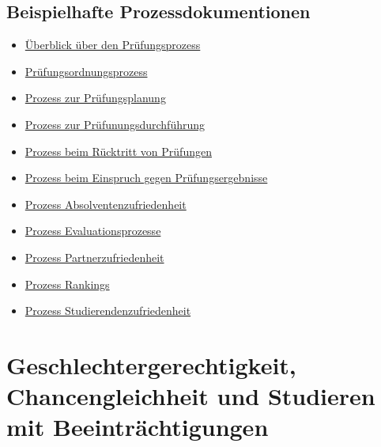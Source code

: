 \section{Beispielhafte
Prozessdokumentionen}\label{beispielhafte-prozessdokumentionen}

\begin{itemize}
\tightlist
\item
  \href{https://th-koeln.github.io/mi-2017/anhaenge/Prozessbeschreibung_PruefungsprozessUeberblick.pdf}{Überblick
  über den Prüfungsprozess}
\item
  \href{https://th-koeln.github.io/mi-2017/anhaenge/Prozessbeschreibung_Pruefungsordnungsprozess.pdf}{Prüfungsordnungsprozess}
\item
  \href{https://th-koeln.github.io/mi-2017/anhaenge/Prozessbeschreibung_Pruefungplanung.pdf}{Prozess zur
  Prüfungsplanung}
\item
  \href{https://th-koeln.github.io/mi-2017/anhaenge/Prozessbeschreibung_Pruefungdurchfuehren.pdf}{Prozess
  zur Prüfunungsdurchführung}
\item
  \href{https://th-koeln.github.io/mi-2017/anhaenge/Prozessbeschreibung_vonPruefungzuruecktreten.pdf}{Prozess
  beim Rücktritt von Prüfungen}
\item
  \href{https://th-koeln.github.io/mi-2017/anhaenge/Prozessbeschreibung_EinspruchPruefungsergebnisse.pdf}{Prozess
  beim Einspruch gegen Prüfungsergebnisse}
\item
  \href{https://th-koeln.github.io/mi-2017/anhaenge/Prozessbeschreibung-Absolventenzufriedenheit.pdf}{Prozess
  Absolventenzufriedenheit}
\item
  \href{https://th-koeln.github.io/mi-2017/anhaenge/Prozessbeschreibung-Evaluationsprozesse.pdf}{Prozess
  Evaluationsprozesse}
\item
  \href{https://th-koeln.github.io/mi-2017/anhaenge/Prozessbeschreibung-Partnerzufriedenheit.pdf}{Prozess
  Partnerzufriedenheit}
\item
  \href{https://th-koeln.github.io/mi-2017/anhaenge/Prozessbeschreibung-Rankings.pdf}{Prozess Rankings}
\item
  \href{https://th-koeln.github.io/mi-2017/anhaenge/Prozessbeschreibung-Studierendenzufriedenheit.pdf}{Prozess
  Studierendenzufriedenheit}
\end{itemize}

\chapter{Geschlechtergerechtigkeit, Chancengleichheit und Studieren mit
Beeinträchtigungen}\label{geschlechtergerechtigkeit-chancengleichheit-und-studieren-mit-beeintruxe4chtigungen}

